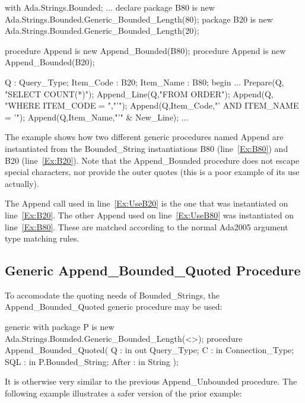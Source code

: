 \documentclass[english,letterpaper]{book}
\begin{document}
\begin{NumberedExample}
with Ada.Strings.Bounded;
...
declare
   package B80 
      is new Ada.Strings.Bounded.Generic_Bounded_Length(80);
   package B20 
      is new Ada.Strings.Bounded.Generic_Bounded_Length(20);

   procedure Append is new Append_Bounded(B80);\label{Ex:B80}
   procedure Append is new Append_Bounded(B20);\label{Ex:B20}

   Q :         Query_Type;
   Item_Code : B20;
   Item_Name : B80;
begin
   ...
   Prepare(Q,    "SELECT COUNT(*)");
   Append_Line(Q,"FROM ORDER");
   Append(Q,     "WHERE ITEM_CODE = ","'");
   Append(Q,Item_Code,"' AND ITEM_NAME = '");\label{Ex:UseB20}
   Append(Q,Item_Name,"'" & New_Line);\label{Ex:UseB80}
   ...
\end{NumberedExample}

The example shows how two different generic procedures named Append
are instantiated from the Bounded\_String instantiations B80 (line~\ref{Ex:B80})
and B20 (line~\ref{Ex:B20}). Note that the Append\_Bounded procedure does not escape
special characters, nor provide the outer quotes (this is a poor example of its
use actually).

The Append call used in line~\ref{Ex:UseB20} is the one that was
instantiated on line~\ref{Ex:B20}. The other Append used on
line~\ref{Ex:UseB80} was instantiated on line~\ref{Ex:B80}. These
are matched according to the normal Ada2005 argument type matching
rules.

\subsection{Generic Append\_Bounded\_Quoted Procedure}

To accomodate the quoting needs of Bounded\_Strings, the Append\_Bounded\_Quoted
generic procedure may be used:

\begin{Code}
generic
   with package P
      is new Ada.Strings.Bounded.Generic_Bounded_Length(<>);
procedure Append_Bounded_Quoted(
   Q :     in out Query_Type;
   C :     in     Connection_Type;
   SQL :   in     P.Bounded_String;
   After : in     String
);
\end{Code}

It is otherwise very similar to the previous Append\_Unbounded procedure.
The following example illustrates a safer version of the prior example:
\end{document}
